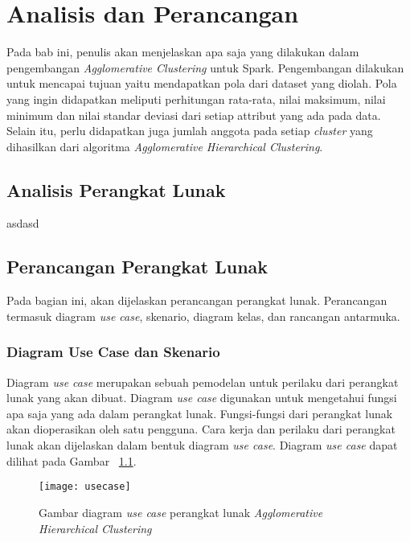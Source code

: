 \chapter{Analisis dan Perancangan}
\label{chap:Analisis dan Perancangan}

Pada bab ini, penulis akan menjelaskan apa saja yang dilakukan dalam pengembangan \textit{Agglomerative Clustering} untuk Spark. Pengembangan dilakukan untuk mencapai tujuan yaitu mendapatkan pola dari dataset yang diolah. Pola yang ingin didapatkan meliputi perhitungan rata-rata, nilai maksimum, nilai minimum dan nilai standar deviasi dari setiap attribut yang ada pada data. Selain itu, perlu didapatkan juga jumlah anggota pada setiap \textit{cluster} yang dihasilkan dari algoritma \textit{Agglomerative Hierarchical Clustering}.


\section{Analisis Perangkat Lunak}

asdasd

\section{Perancangan Perangkat Lunak}

Pada bagian ini, akan dijelaskan perancangan perangkat lunak.  Perancangan termasuk diagram \textit{use case}, skenario, diagram kelas, dan rancangan antarmuka. 

\subsection{Diagram Use Case dan Skenario}

Diagram \textit{use case} merupakan sebuah pemodelan untuk perilaku dari perangkat lunak yang akan dibuat. Diagram \textit{use case} digunakan untuk mengetahui fungsi apa saja yang ada dalam perangkat lunak. Fungsi-fungsi dari perangkat lunak akan dioperasikan oleh satu pengguna. Cara kerja dan perilaku dari perangkat lunak akan dijelaskan dalam bentuk diagram \textit{use case}. Diagram \textit{use case} dapat dilihat pada Gambar ~\ref{fig:usecase}.

\begin{figure}[H]
    \centering  
    \texttt{[image: usecase]}  
    \caption[Gambar diagram \textit{use case} perangkat lunak \textit{Agglomerative Hierarchical Clustering}]{Gambar diagram \textit{use case} perangkat lunak \textit{Agglomerative Hierarchical Clustering}} 
    \label{fig:usecase} 
\end{figure}

